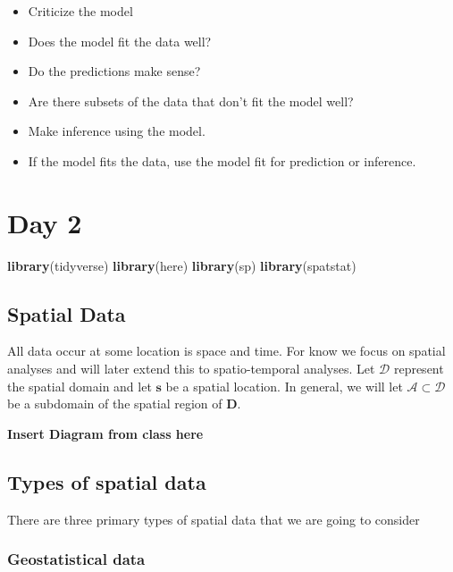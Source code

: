 \documentclass[]{book}
\newenvironment{Shaded}{\begin{snugshade}}{\end{snugshade}}
\newcommand{\KeywordTok}[1]{\textcolor[rgb]{0.13,0.29,0.53}{\textbf{#1}}}
\newcommand{\NormalTok}[1]{#1}
\begin{document}
\begin{itemize}
\item
  Criticize the model
\item
  Does the model fit the data well?
\item
  Do the predictions make sense?
\item
  Are there subsets of the data that don't fit the model well?
\item
  Make inference using the model.
\item
  If the model fits the data, use the model fit for prediction or inference.
\end{itemize}

\hypertarget{day-2}{%
\chapter{Day 2}\label{day-2}}

\begin{Shaded}
\begin{Highlighting}[]
\KeywordTok{library}\NormalTok{(tidyverse)}
\KeywordTok{library}\NormalTok{(here)}
\KeywordTok{library}\NormalTok{(sp)}
\KeywordTok{library}\NormalTok{(spatstat)}
\end{Highlighting}
\end{Shaded}

\hypertarget{spatial-data}{%
\section{Spatial Data}\label{spatial-data}}

All data occur at some location is space and time. For know we focus on spatial analyses and will later extend this to spatio-temporal analyses. Let \(\mathcal{D}\) represent the spatial domain and let \(\mathbf{s}\) be a spatial location. In general, we will let \(\mathcal{A} \subset \mathcal{D}\) be a subdomain of the spatial region of \(\mathbf{D}\).

\textbf{Insert Diagram from class here}

\hypertarget{types-of-spatial-data}{%
\section{Types of spatial data}\label{types-of-spatial-data}}

There are three primary types of spatial data that we are going to consider

\hypertarget{geostatistical-data}{%
\subsection{Geostatistical data}\label{geostatistical-data}}
\end{document}
